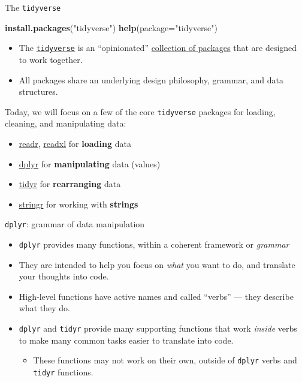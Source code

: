 \documentclass[
  11pt,
  ignorenonframetext,
]{beamer}
\newenvironment{Shaded}{\begin{snugshade}}{\end{snugshade}}
\newcommand{\AttributeTok}[1]{\textcolor[rgb]{0.13,0.29,0.53}{#1}}
\newcommand{\FunctionTok}[1]{\textcolor[rgb]{0.13,0.29,0.53}{\textbf{#1}}}
\newcommand{\NormalTok}[1]{#1}
\newcommand{\StringTok}[1]{\textcolor[rgb]{0.31,0.60,0.02}{#1}}
\providecommand{\tightlist}{%
  \setlength{\itemsep}{0pt}\setlength{\parskip}{0pt}}
\begin{document}
\begin{frame}[fragile]{The \texttt{tidyverse}}
\protect\hypertarget{the-tidyverse}{}
\begin{Shaded}
\begin{Highlighting}[]
\FunctionTok{install.packages}\NormalTok{(}\StringTok{"tidyverse"}\NormalTok{)}
\FunctionTok{help}\NormalTok{(}\AttributeTok{package=}\StringTok{"tidyverse"}\NormalTok{)}
\end{Highlighting}
\end{Shaded}

\begin{itemize}
\item
  The \href{https://www.tidyverse.org/}{\texttt{tidyverse}} is an
  ``opinionated'' \href{https://www.tidyverse.org/packages/}{collection
  of packages} that are designed to work together.
\item
  All packages share an underlying design philosophy, grammar, and data
  structures.
\end{itemize}

Today, we will focus on a few of the core \texttt{tidyverse} packages
for loading, cleaning, and manipulating data:

\begin{itemize}
\tightlist
\item
  \href{https://readr.tidyverse.org/}{readr},
  \href{https://readxl.tidyverse.org/}{readxl} for \textbf{loading} data
\item
  \href{https://dplyr.tidyverse.org/}{dplyr} for \textbf{manipulating}
  data (values)
\item
  \href{https://tidyr.tidyverse.org/}{tidyr} for \textbf{rearranging}
  data
\item
  \href{https://stringr.tidyverse.org/}{stringr} for working with
  \textbf{strings}
\end{itemize}
\end{frame}

\begin{frame}[fragile]{\texttt{dplyr}: grammar of data manipulation}
\protect\hypertarget{dplyr-grammar-of-data-manipulation}{}
\begin{itemize}
\item
  \texttt{dplyr} provides many functions, within a coherent framework or
  \emph{grammar}
\item
  They are intended to help you focus on \emph{what} you want to do, and
  translate your thoughts into code.
\item
  High-level functions have active names and called ``verbs'' --- they
  describe what they do.
\item
  \texttt{dplyr} and \texttt{tidyr} provide many supporting functions
  that work \emph{inside} verbs to make many common tasks easier to
  translate into code.

  \begin{itemize}
  \tightlist
  \item
    These functions may not work on their own, outside of \texttt{dplyr}
    verbs and \texttt{tidyr} functions.
  \end{itemize}
\end{itemize}
\end{frame}
\end{document}
